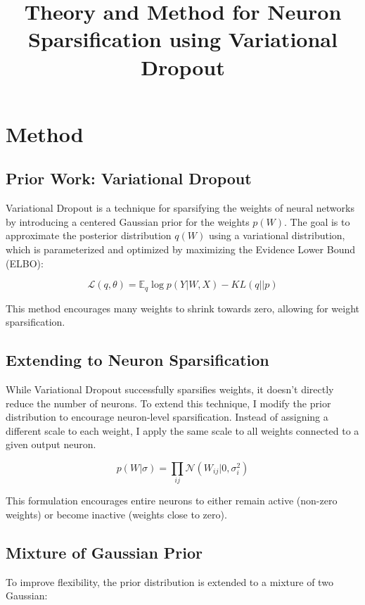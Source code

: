 \documentclass{article}
\newcommand{\N}{\mathcal{N}}
\newcommand{\E}{\mathbb{E}}
\renewcommand{\L}{\mathcal{L}}
\begin{document}
\title{Theory and Method for Neuron Sparsification using Variational Dropout}
\author{}
\date{}
\maketitle

\section{Method}

\subsection{Prior Work: Variational Dropout}
Variational Dropout is a technique for sparsifying the weights of neural networks by introducing a centered Gaussian prior for the weights $p(W)$. The goal is to approximate the posterior distribution $q(W)$ using a variational distribution, which is parameterized and optimized by maximizing the Evidence Lower Bound (ELBO):

\begin{equation}
    \L(q, \theta) = \E_q \log p(Y | W, X) - KL(q || p)
\end{equation}

This method encourages many weights to shrink towards zero, allowing for weight sparsification.

\subsection{Extending to Neuron Sparsification}
While Variational Dropout successfully sparsifies weights, it doesn't directly reduce the number of neurons. To extend this technique, I modify the prior distribution to encourage neuron-level sparsification. Instead of assigning a different scale to each weight, I apply the same scale to all weights connected to a given output neuron.

\begin{equation}
    p(W|\sigma) = \prod_{ij} \N(W_{ij}|0, \sigma_i^2)
\end{equation}

This formulation encourages entire neurons to either remain active (non-zero weights) or become inactive (weights close to zero).

\subsection{Mixture of Gaussian Prior}
To improve flexibility, the prior distribution is extended to a mixture of two Gaussian:
\end{document}
